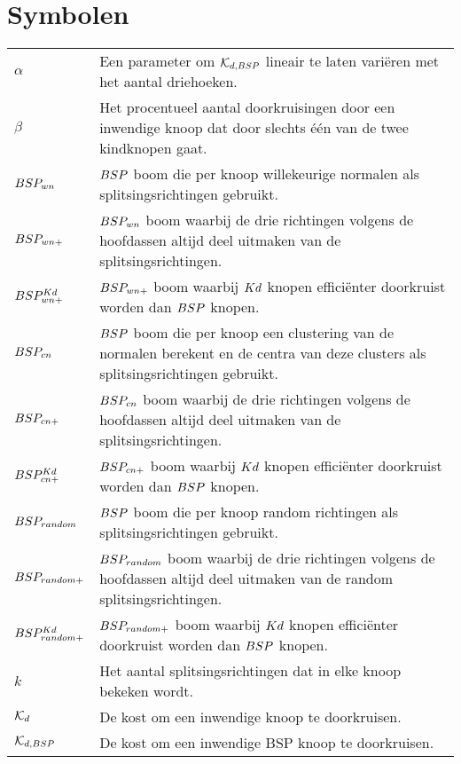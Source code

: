 \documentclass[master=cws,masteroption=mmc]{kulemt}
\begin{document}
\section*{Symbolen}
\begin{flushleft}
  \renewcommand{\arraystretch}{1.1}
  \begin{tabularx}{\textwidth}{@{}p{25mm}X@{}}
    $\alpha$ & Een parameter om $\mathcal{K}_{d,BSP}$ lineair te laten variëren met het aantal driehoeken. \\
    $\beta$ & Het procentueel aantal doorkruisingen door een inwendige knoop dat door slechts één van de twee kindknopen gaat. \\
    $BSP_{wn}$ & $BSP$ boom die per knoop willekeurige normalen als splitsingsrichtingen gebruikt. \\
    $BSP_{wn+}$ & $BSP_{wn}$ boom waarbij de drie richtingen volgens de hoofdassen altijd deel uitmaken van de splitsingsrichtingen. \\
    $BSP^{Kd}_{wn+}$ & $BSP_{wn+}$ boom waarbij $Kd$ knopen efficiënter doorkruist worden dan $BSP$ knopen. \\
    $BSP_{cn}$ & $BSP$ boom die per knoop een clustering van de normalen berekent en de centra van deze clusters als splitsingsrichtingen gebruikt. \\
    $BSP_{cn+}$ & $BSP_{cn}$ boom waarbij de drie richtingen volgens de hoofdassen altijd deel uitmaken van de splitsingsrichtingen. \\
    $BSP^{Kd}_{cn+}$ & $BSP_{cn+}$ boom waarbij $Kd$ knopen efficiënter doorkruist worden dan $BSP$ knopen. \\
    $BSP_{random}$ & $BSP$ boom die per knoop random richtingen als splitsingsrichtingen gebruikt. \\
    $BSP_{random+}$ & $BSP_{random}$ boom waarbij de drie richtingen volgens de hoofdassen altijd deel uitmaken van de random splitsingsrichtingen. \\
    $BSP^{Kd}_{random+}$ & $BSP_{random+}$ boom waarbij $Kd$ knopen efficiënter doorkruist worden dan $BSP$ knopen. \\
    $k$ & Het aantal splitsingsrichtingen dat in elke knoop bekeken wordt. \\
    $\mathcal{K}_{d}$ & De kost om een inwendige knoop te doorkruisen. \\
    $\mathcal{K}_{d,BSP}$ & De kost om een inwendige BSP knoop te doorkruisen. \\

\end{tabularx}
\end{flushleft}
\end{document}
